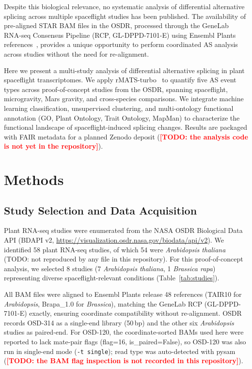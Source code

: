 \documentclass[12pt,a4paper]{article}
\newcommand{\TODO}[1]{\textcolor{red}{\textbf{[TODO: #1]}}}
\begin{document}
Despite this biological relevance, no systematic analysis of differential alternative splicing across multiple spaceflight studies has been published. The availability of pre-aligned STAR BAM files in the OSDR, processed through the GeneLab RNA-seq Consensus Pipeline (RCP, GL-DPPD-7101-E) using Ensembl Plants references~\cite{genelab_rcp}, provides a unique opportunity to perform coordinated AS analysis across studies without the need for re-alignment.

Here we present a multi-study analysis of differential alternative splicing in plant spaceflight transcriptomes. We apply rMATS-turbo~\cite{rmats_turbo} to quantify five AS event types across proof-of-concept studies from the OSDR, spanning spaceflight, microgravity, Mars gravity, and cross-species comparisons. We integrate machine learning classification, unsupervised clustering, and multi-ontology functional annotation (GO, Plant Ontology, Trait Ontology, MapMan) to characterize the functional landscape of spaceflight-induced splicing changes. Results are packaged with FAIR metadata for a planned Zenodo deposit (\TODO{the analysis code is not yet in the repository}).

\section{Methods}

\subsection{Study Selection and Data Acquisition}

Plant RNA-seq studies were enumerated from the NASA OSDR Biological Data API (BDAPI v2, \url{https://visualization.osdr.nasa.gov/biodata/api/v2}). We identified 58 plant RNA-seq studies, of which 54 were \textit{Arabidopsis thaliana} (TODO: not reproduced by any file in this repository). For this proof-of-concept analysis, we selected 8 studies (7 \textit{Arabidopsis thaliana}, 1 \textit{Brassica rapa}) representing diverse spaceflight-relevant conditions (Table~\ref{tab:studies}).

All BAM files were aligned to Ensembl Plants release 48 references (TAIR10 for \textit{Arabidopsis}, Brapa\_1.0 for \textit{Brassica}), matching the GeneLab RCP (GL-DPPD-7101-E) exactly, ensuring coordinate compatibility without re-alignment. OSDR records OSD-314 as a single-end library (50\,bp) and the other six \textit{Arabidopsis} studies as paired-end. For OSD-120, the coordinate-sorted BAMs used here were reported to lack mate-pair flags (flag=16, is\_paired=False), so OSD-120 was also run in single-end mode (\texttt{-t single}); read type was auto-detected with pysam (\TODO{the BAM flag inspection is not recorded in this repository}).
\end{document}
